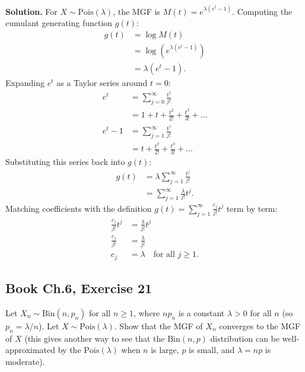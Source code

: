 \documentclass[11pt,a4paper]{article}
\begin{document}
\noindent \textbf{Solution.} For $X \sim \text{Pois}(\lambda)$, the MGF is $M(t) = e^{\lambda(e^t - 1)}$. Computing the cumulant generating function $g(t)$:
\begin{align*}
g(t) &= \log M(t) \\
&= \log\left( e^{\lambda(e^t - 1)} \right) \\
&= \lambda(e^t - 1).
\end{align*}
Expanding $e^t$ as a Taylor series around $t = 0$:
\begin{align*}
e^t &= \sum_{j=0}^{\infty} \frac{t^j}{j!} \\
&= 1 + t + \frac{t^2}{2!} + \frac{t^3}{3!} + \dots \\
e^t - 1 &= \sum_{j=1}^{\infty} \frac{t^j}{j!} \\
&= t + \frac{t^2}{2!} + \frac{t^3}{3!} + \dots
\end{align*}
Substituting this series back into $g(t)$:
\begin{align*}
g(t) &= \lambda \sum_{j=1}^{\infty} \frac{t^j}{j!} \\
&= \sum_{j=1}^{\infty} \frac{\lambda}{j!} t^j.
\end{align*}
Matching coefficients with the definition $g(t) = \sum_{j=1}^{\infty} \frac{c_j}{j!} t^j$ term by term:
\begin{align*}
\frac{c_j}{j!} t^j &= \frac{\lambda}{j!} t^j \\
\frac{c_j}{j!} &= \frac{\lambda}{j!} \\
c_j &= \lambda \quad \text{for all } j \ge 1.
\end{align*}

\vspace{10pt}
\subsection{Book Ch.6, Exercise 21}
\begin{tcolorbox}[title={Book Ch.6, Exercise 21}]
Let $X_n \sim \text{Bin}(n, p_n)$ for all $n \ge 1$, where $np_n$ is a constant $\lambda > 0$ for all $n$ (so $p_n = \lambda / n$). Let $X \sim \text{Pois}(\lambda)$. Show that the MGF of $X_n$ converges to the MGF of $X$ (this gives another way to see that the $\text{Bin}(n, p)$ distribution can be well-approximated by the $\text{Pois}(\lambda)$ when $n$ is large, $p$ is small, and $\lambda = np$ is moderate).
\end{tcolorbox}
\end{document}
